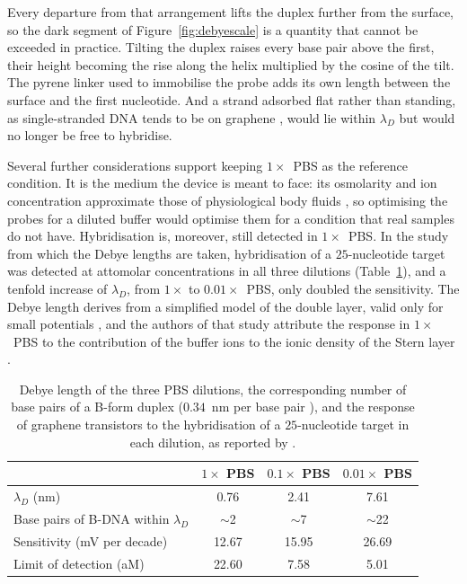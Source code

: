 Every departure from that arrangement lifts the duplex further from the surface, so the dark segment
of Figure~\ref{fig:debyescale} is a quantity that cannot be exceeded in practice. Tilting the duplex
raises every base pair above the first, their height becoming the rise along the helix multiplied by
the cosine of the tilt. The pyrene linker used to immobilise the probe adds its own length between
the surface and the first nucleotide. And a strand adsorbed flat rather than standing, as
single-stranded DNA tends to be on graphene \citep{green2015}, would lie within $\lambda_D$ but
would no longer be free to hybridise.

Several further considerations support keeping $1\times$~PBS as the reference condition. It is the
medium the device is meant to face: its osmolarity and ion concentration approximate those of
physiological body fluids \citep{purwidyantri2021}, so optimising the probes for a diluted buffer would
optimise them for a condition that real samples do not have. Hybridisation is, moreover, still detected
in $1\times$~PBS. In the study from which the Debye lengths are taken, hybridisation of a
$25$-nucleotide target was detected at attomolar concentrations in all three dilutions
(Table~\ref{tab:inl}), and a tenfold increase of $\lambda_D$, from $1\times$ to $0.01\times$~PBS, only
doubled the sensitivity. The Debye length derives from a simplified model of the double layer, valid
only for small potentials \citep{kesler2020}, and the authors of that study attribute the response in
$1\times$~PBS to the contribution of the buffer ions to the ionic density of the Stern layer
\citep{purwidyantri2021}.

\begin{table}[H]
\begin{center}
\begin{tabular}{l c c c}
\hline
 & \textbf{$1\times$ PBS} & \textbf{$0.1\times$ PBS} & \textbf{$0.01\times$ PBS} \\
\hline
$\lambda_D$ (nm)                            & 0.76  & 2.41  & 7.61  \\
Base pairs of B-DNA within $\lambda_D$      & $\sim$2 & $\sim$7 & $\sim$22 \\
Sensitivity (mV per decade)                 & 12.67 & 15.95 & 26.69 \\
Limit of detection (aM)                     & 22.60 & 7.58  & 5.01  \\
\hline
\end{tabular}
\end{center}
\caption[Debye length and device response per dilution]{Debye length of the three PBS dilutions,
the corresponding number of base pairs of a B-form
duplex ($0.34$~nm per base pair \citep{watsoncrick1953}), and the response of graphene transistors to the
hybridisation of a $25$-nucleotide target in each dilution, as reported by \citet{purwidyantri2021}.}
\label{tab:inl}
\end{table}

